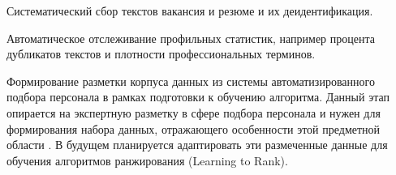\begin{compactenum}
  \item Систематический сбор текстов вакансия и резюме и их деидентификация.
  \item Автоматическое отслеживание профильных статистик, например процента дубликатов текстов и плотности профессиональных терминов.
  \item Формирование разметки корпуса данных из системы автоматизированного подбора персонала в рамках подготовки к обучению алгоритма. Данный этап опирается на экспертную разметку в сфере подбора персонала и нужен для формирования набора данных, отражающего особенности этой предметной области \cite{src24}. В будущем планируется адаптировать эти размеченные данные для обучения алгоритмов ранжирования (Learning to Rank).
\end{compactenum}
